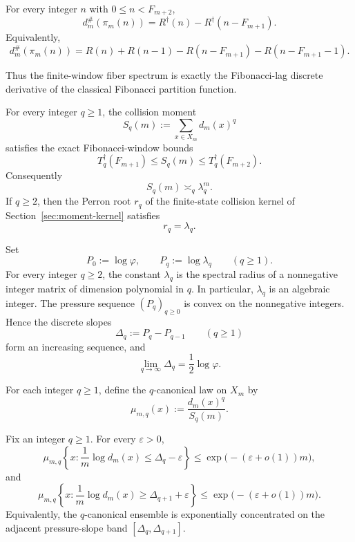 \begin{theoremA}
For every integer \(n\) with \(0\le n<F_{m+2}\),
\[
  d_m^\#(\pi_m(n))
  =
  R^\dagger(n)-R^\dagger(n-F_{m+1}).
\]
Equivalently,
\[
  d_m^\#(\pi_m(n))
  =
  R(n)+R(n-1)-R(n-F_{m+1})-R(n-F_{m+1}-1).
\]
\end{theoremA}

\noindent
Thus the finite-window fiber spectrum is exactly the Fibonacci-lag discrete
derivative of the classical Fibonacci partition function.

\begin{theoremB}
For every integer \(q\ge 1\), the collision moment
\[
  S_q(m):=\sum_{x\in X_m} d_m(x)^q
\]
satisfies the exact Fibonacci-window bounds
\[
  T_q^\dagger(F_{m+1})\le S_q(m)\le T_q^\dagger(F_{m+2}).
\]
Consequently
\[
  S_q(m)\asymp_q \lambda_q^m.
\]
If \(q\ge 2\), then the Perron root \(r_q\) of the finite-state collision
kernel of Section~\ref{sec:moment-kernel} satisfies
\[
  r_q=\lambda_q.
\]
\end{theoremB}

\begin{theoremC}
Set
\[
  P_0:=\log\varphi,
  \qquad
  P_q:=\log\lambda_q
  \qquad (q\ge 1).
\]
For every integer \(q\ge 2\), the constant \(\lambda_q\) is the spectral
radius of a nonnegative integer matrix of dimension polynomial in \(q\).  In
particular, \(\lambda_q\) is an algebraic integer.  The pressure sequence
\((P_q)_{q\ge 0}\) is convex on the nonnegative integers.  Hence the discrete
slopes
\[
  \Delta_q:=P_q-P_{q-1}
  \qquad (q\ge 1)
\]
form an increasing sequence, and
\[
  \lim_{q\to\infty}\Delta_q=\frac12\log\varphi.
\]
\end{theoremC}

For each integer \(q\ge 1\), define the \(q\)-canonical law on \(X_m\) by
\[
  \mu_{m,q}(x):=\frac{d_m(x)^q}{S_q(m)}.
\]

\begin{theoremD}
Fix an integer \(q\ge 1\).  For every \(\varepsilon>0\),
\[
  \mu_{m,q}\!\left\{
    x:\frac1m\log d_m(x)\le \Delta_q-\varepsilon
  \right\}
  \le
  \exp\bigl(-(\varepsilon+o(1))m\bigr),
\]
and
\[
  \mu_{m,q}\!\left\{
    x:\frac1m\log d_m(x)\ge \Delta_{q+1}+\varepsilon
  \right\}
  \le
  \exp\bigl(-(\varepsilon+o(1))m\bigr).
\]
Equivalently, the \(q\)-canonical ensemble is exponentially concentrated on the
adjacent pressure-slope band \([\Delta_q,\Delta_{q+1}]\).
\end{theoremD}

